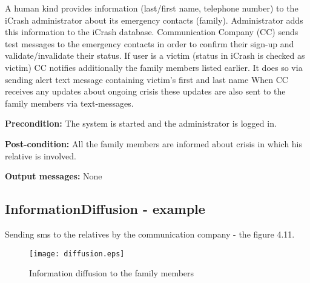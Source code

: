 A human kind provides  information  (last/first  name,  telephone number)  to  the  iCrash administrator  about  its  emergency  contacts (family). Administrator  adds  this information  to  the  iCrash  database.
Communication  Company (CC) sends test messages to the emergency contacts in
order to confirm their sign-up and validate/invalidate their status. If user 
is  a  victim  (status  in  iCrash  is  checked  as victim) CC  notifies additionally  the  family  members  listed  earlier.  It  does  so  via  sending  alert  text message  containing  victim's  first  and  last  name
When CC receives any updates about ongoing crisis these updates are also sent to
the family members via text-messages. 

\begin{description}
	\item \textbf{Precondition:} The system is started and the administrator is
	logged in.
	\item \textbf{Post-condition:} All the family members are informed about crisis
	in which his relative is involved.
	\item \textbf{Output messages:} None
	
\end{description}


\subsection{InformationDiffusion - example}
Sending sms to the relatives by the communication company - the figure 4.11.
\begin{figure}[h]
    \texttt{[image: diffusion.eps]}
	\caption{Information diffusion to the family members}
\end{figure}

